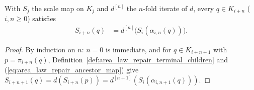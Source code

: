\begin{lemma}
    \label{thm:area_law_repair_descendant_scales}
    \leanok
    With $S_j$ the scale map on $K_j$ and $d^{[n]}$ the $n$-fold iterate of $d$, every
    $q\in K_{i+n}$ ($i,n\ge0$) satisfies
    \begin{align}
        S_{i+n}(q) & =d^{[n]}\bigl(S_i(\alpha_{i,n}(q))\bigr).
        \label{eq:area_law_repair_descendant_scales}
    \end{align}
\end{lemma}
\begin{proof}\leanok
    By induction on $n$: $n=0$ is immediate, and for $q\in K_{i+n+1}$ with $p=\pi_{i+n}(q)$,
    Definition~\ref{def:area_law_repair_terminal_children} and (\ref{eq:area_law_repair_ancestor_map})
    give $S_{i+n+1}(q)=d(S_{i+n}(p))=d^{[n+1]}(S_i(\alpha_{i,n+1}(q)))$.
\end{proof}

